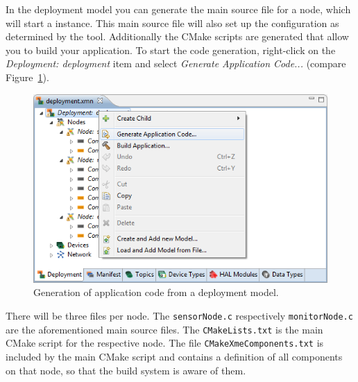 In the deployment model you can generate the main source file for a node, which will start a \xme instance.
This main source file will also set up the \xme configuration as determined by the tool.
Additionally the CMake scripts are generated that allow you to build your application.
To start the code generation, right-click on the \emph{Deployment: deployment} item and select \emph{Generate Application Code...}
(compare Figure~\ref{fig:xmt_deployment_generate}).
%
\begin{figure}[ht]
	\centering
	\includegraphics[scale=0.55]{figures/xmt_deployment_generate.png}
	\caption{Generation of application code from a deployment model.}
	\label{fig:xmt_deployment_generate}
\end{figure}
%
There will be three files per node.
The \verb|sensorNode.c| respectively \verb|monitorNode.c| are the aforementioned main source files.
The \verb|CMakeLists.txt| is the main CMake script for the respective node.
The file \verb|CMakeXmeComponents.txt| is included by the main CMake script and contains a definition of all components on that node, so that the build system is aware of them.

